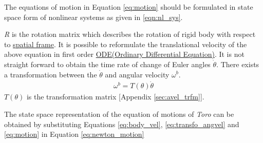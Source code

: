The equations of motion in Equation \ref{eq:motion} should be formulated in state space form of nonlinear systems as given in \ref{eqn:nl_sys}.

 \emph{R} is the rotation matrix which describes the rotation of rigid body with respect to \underline{spatial frame}. It is possible to reformulate the translational velocity of the above equation in first order \underline{ODE(Ordinary Differential Equation)}. It is not straight forward to obtain the time rate of change of Euler angles $\dot{\theta}$. There exists a transformation between the $\dot{\theta}$ and angular velocity $\omega^b$.
\begin{equation}
\label{eq:transfo_angvel}
\begin{split}
\omega^b = T(\theta)\dot{\theta}
\end{split}
\end{equation}
$T(\theta)$ is the transformation matrix [Appendix \ref{sec:avel_trfm}]. 

The state space representation of the equation of motions of \emph{Toro} can be obtained by substituting Equations \ref{eq:body_vel}, \ref{eq:transfo_angvel} and \ref{eq:motion} in Equation \ref{eq:newton_motion}

